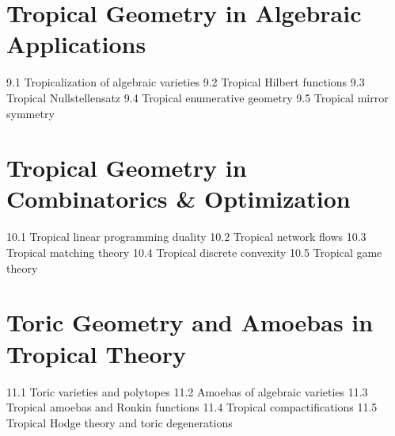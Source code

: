 \section{Tropical Geometry in Algebraic Applications}
9.1 Tropicalization of algebraic varieties
9.2 Tropical Hilbert functions
9.3 Tropical Nullstellensatz
9.4 Tropical enumerative geometry
9.5 Tropical mirror symmetry
\section{Tropical Geometry in Combinatorics \& Optimization}
10.1 Tropical linear programming duality
10.2 Tropical network flows
10.3 Tropical matching theory
10.4 Tropical discrete convexity
10.5 Tropical game theory
\section{Toric Geometry and Amoebas in Tropical Theory}
11.1 Toric varieties and polytopes
11.2 Amoebas of algebraic varieties
11.3 Tropical amoebas and Ronkin functions
11.4 Tropical compactifications
11.5 Tropical Hodge theory and toric degenerations
